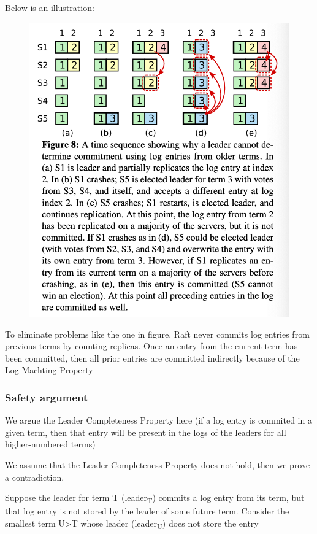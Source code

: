 \documentclass[11pt]{article}
\begin{document}
Below is an illustration:
\begin{figure}[htbp]
\centering
\includegraphics[width=.7\textwidth]{../images/6.824/8.png}
\label{}
\end{figure}

To eliminate problems like the one in figure, Raft never commits log entries from previous terms
by counting replicas. Once an entry from the current term has been committed, then all prior
entries are committed indirectly because of the Log Machting Property
\subsubsection{Safety argument}
\label{sec:org2b841d6}
We argue the Leader Completeness Property here (if a log entry is commited in a given term, then
that entry will be present in the logs of the leaders for all higher-numbered terms)

We assume that the Leader Completeness Property does not hold, then we prove a contradiction.

Suppose the leader for term T (leader\textsubscript{T}) commits a log entry from its term, but
that log entry is not stored by the leader of some future term. Consider the smallest term U>T
whose leader (leader\textsubscript{U}) does not store the entry
\end{document}
